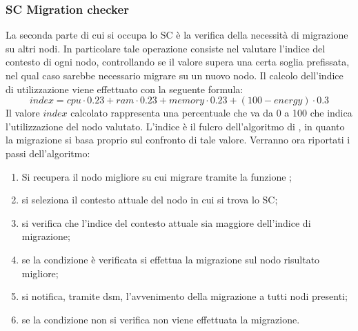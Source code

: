 \subsubsection{SC Migration checker}
La seconda parte di cui si occupa lo SC è la verifica della necessità di migrazione su altri nodi. In particolare tale operazione consiste nel valutare l'indice del contesto di ogni nodo, controllando se il valore supera una certa soglia prefissata, nel qual caso sarebbe necessario migrare su un nuovo nodo. Il calcolo dell'indice di utilizzazione viene effettuato con la seguente formula:
\begin{equation}\label{eq:index}
index = cpu \cdot 0.23 + ram \cdot 0.23 + memory \cdot 0.23 + (100-energy) \cdot 0.3
\end{equation}
Il valore $index$ calcolato rappresenta una percentuale che va da 0 a 100 che indica l'utilizzazione del nodo valutato. L'indice è il fulcro dell'algoritmo di , in quanto la migrazione si basa proprio sul confronto di tale valore. Verranno ora riportati i passi dell'algoritmo:
\begin{enumerate}
	\item Si recupera il nodo migliore su cui migrare tramite la funzione ;
	\item si seleziona il contesto attuale del nodo in cui si trova lo SC;
	\item si verifica che l'indice del contesto attuale sia maggiore dell'indice di migrazione;
	\item se la condizione è verificata si effettua la migrazione sul nodo risultato migliore;
	\item si notifica, tramite dsm, l'avvenimento della migrazione a tutti nodi presenti;
	\item se la condizione non si verifica non viene effettuata la migrazione.
\end{enumerate}
